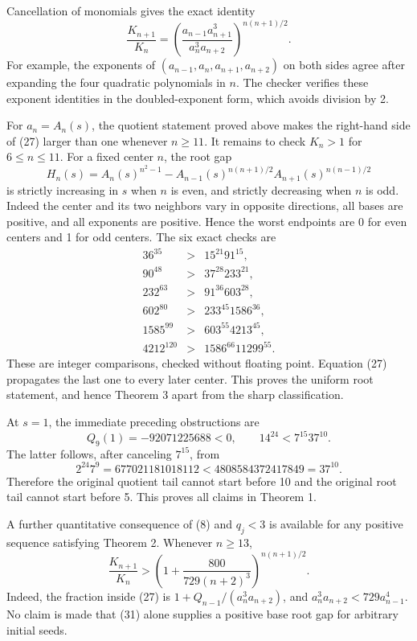 \documentclass[
  11pt,
  a4paper,
]{article}
\begin{document}
Cancellation of monomials gives the exact identity \[
\frac{K_{n+1}}{K_n}
=\left(\frac{a_{n-1}a_{n+1}^3}{a_n^3a_{n+2}}\right)^{n(n+1)/2}.
\tag{27}
\] For example, the exponents of \((a_{n-1},a_n,a_{n+1},a_{n+2})\) on
both sides agree after expanding the four quadratic polynomials in
\(n\). The checker verifies these exponent identities in the
doubled-exponent form, which avoids division by 2.

For \(a_n=A_n(s)\), the quotient statement proved above makes the
right-hand side of (27) larger than one whenever \(n\ge11\). It remains
to check \(K_n>1\) for \(6\le n\le11\). For a fixed center \(n\), the
root gap \[
H_n(s)=A_n(s)^{n^2-1}
-A_{n-1}(s)^{n(n+1)/2}A_{n+1}(s)^{n(n-1)/2}
\tag{28}
\] is strictly increasing in \(s\) when \(n\) is even, and strictly
decreasing when \(n\) is odd. Indeed the center and its two neighbors
vary in opposite directions, all bases are positive, and all exponents
are positive. Hence the worst endpoints are 0 for even centers and 1 for
odd centers. The six exact checks are \[
\begin{array}{rcl}
36^{35}&>&15^{21}91^{15},\\
90^{48}&>&37^{28}233^{21},\\
232^{63}&>&91^{36}603^{28},\\
602^{80}&>&233^{45}1586^{36},\\
1585^{99}&>&603^{55}4213^{45},\\
4212^{120}&>&1586^{66}11299^{55}.
\end{array}
\tag{29}
\] These are integer comparisons, checked without floating point.
Equation (27) propagates the last one to every later center. This proves
the uniform root statement, and hence Theorem 3 apart from the sharp
classification.

At \(s=1\), the immediate preceding obstructions are \[
Q_9(1)=-92071225688<0,
\qquad14^{24}<7^{15}37^{10}.
\tag{30}
\] The latter follows, after canceling \(7^{15}\), from \[
2^{24}7^9=677021181018112
<4808584372417849=37^{10}.
\] Therefore the original quotient tail cannot start before 10 and the
original root tail cannot start before 5. This proves all claims in
Theorem 1.

A further quantitative consequence of (8) and \(q_j<3\) is available for
any positive sequence satisfying Theorem 2. Whenever \(n\ge13\), \[
\frac{K_{n+1}}{K_n}>
\left(1+\frac{800}{729(n+2)^3}\right)^{n(n+1)/2}.
\tag{31}
\] Indeed, the fraction inside (27) is \(1+Q_{n-1}/(a_n^3a_{n+2})\), and
\(a_n^3a_{n+2}<729a_{n-1}^4\). No claim is made that (31) alone supplies
a positive base root gap for arbitrary initial seeds.
\end{document}
